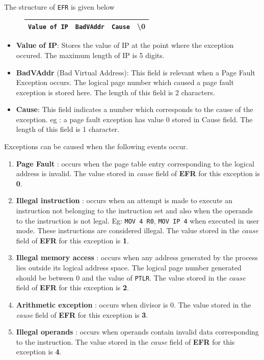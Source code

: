 \documentclass[11pt]{report}
\begin{document}
The structure of \texttt{EFR} is given below
		\begin{figure}[htp!]
		\centering
		\begin{tabular}{|c|c|c|c|}
		\hline
		\texttt{Value of IP} & \texttt{BadVAddr} & \texttt{Cause} &  \textbackslash 0 \\
		\hline
		\end{tabular}
		\end{figure}

\begin{itemize}
\item \textbf{Value of IP}: Stores the value of IP at the point where the exception occured. The maximum length of IP is 5 digits.
\item \textbf{BadVAddr} (Bad Virtual Address): This field is relevant when a Page Fault Exception occurs. The logical page number which caused a page fault exception is stored here. The length of this field is 2 characters.
\item \textbf{Cause}: This field indicates a number which corresponds to the cause of the exception. 
eg : a page fault exception has value 0 stored in Cause field. The length of this field is 1 character.
\end{itemize}

Exceptions can be caused when the following events occur.

\begin{enumerate}
\item \textbf{Page Fault} : occurs when the page table entry corresponding to the logical address is invalid. The value stored in \textit{cause} field of \textbf{EFR} for this exception is \textbf{0}.

\item \textbf{Illegal instruction} : occurs when an attempt is made to execute an instruction not belonging to the instruction set and also when the operands to the instruction is not legal. Eg: \texttt{MOV 4 R0}, \texttt{MOV IP 4} when executed in user mode. These instructions are considered illegal. The value stored in the \textit{cause} field of \textbf{EFR} for this exception is \textbf{1}.

\item \textbf{Illegal memory access} : occurs when any address generated by the process lies outside its logical address space. The logical page number generated should be between 0 and the value of \texttt{PTLR}.  The value stored in the \textit{cause} field of \textbf{EFR} for this exception is \textbf{2}.

\item \textbf{Arithmetic exception} : occurs when divisor is 0. The value stored in the \textit{cause} field of \textbf{EFR} for this exception is \textbf{3}.

\item \textbf{Illegal operands} : occurs when operands contain invalid data corresponding to the instruction. The value stored in the \textit{cause} field of \textbf{EFR} for this exception is \textbf{4}.


\end{enumerate}
\end{document}
